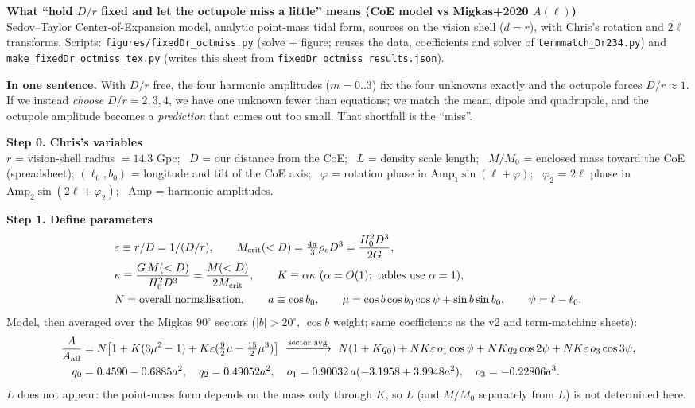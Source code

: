 \documentclass[10pt]{article}
\begin{document}
{\large\textbf{What ``hold $D/r$ fixed and let the octupole miss a little'' means (CoE model vs Migkas+2020 $A(\ell)$)}}\\[2pt]
Sedov--Taylor Center-of-Expansion model, analytic point-mass tidal form, sources on the vision shell ($d=r$), with Chris's rotation and $2\ell$ transforms.
Scripts: \texttt{figures/fixedDr\_octmiss.py} (solve + figure; reuses the data, coefficients and solver of \texttt{termmatch\_Dr234.py}) and \texttt{make\_fixedDr\_octmiss\_tex.py} (writes this sheet from \texttt{fixedDr\_octmiss\_results.json}).

\textbf{In one sentence.} With $D/r$ free, the four harmonic amplitudes ($m=0..3$) fix the four unknowns exactly and the octupole forces $D/r\approx1$. If we instead \emph{choose} $D/r=2,3,4$, we have one unknown fewer than equations; we match the mean, dipole and quadrupole, and the octupole amplitude becomes a \emph{prediction} that comes out too small. That shortfall is the ``miss''.

\medskip\textbf{Step 0. Chris's variables}\\
$r$ = vision-shell radius $=14.3$ Gpc; \ $D$ = our distance from the CoE; \ $L$ = density scale length; \ $M/M_0$ = enclosed mass toward the CoE (spreadsheet);
$(\ell_0,b_0)$ = longitude and tilt of the CoE axis; \ $\varphi$ = rotation phase in $\mathrm{Amp}_1\sin(\ell+\varphi)$; \ $\varphi_2$ = $2\ell$ phase in $\mathrm{Amp}_2\sin(2\ell+\varphi_2)$; \ Amp = harmonic amplitudes.

\medskip\textbf{Step 1. Define parameters}
\begin{align*}
&\varepsilon\equiv r/D=1/(D/r),\qquad M_{\rm crit}(<D)=\tfrac{4\pi}{3}\rho_cD^3=\frac{H_0^2D^3}{2G},\\
&\kappa\equiv\frac{G\,M(<D)}{H_0^2D^3}=\frac{M(<D)}{2M_{\rm crit}},\qquad K\equiv\alpha\kappa\ (\alpha=O(1);\ \text{tables use }\alpha=1),\\
&N=\text{overall normalisation},\qquad a\equiv\cos b_0,\qquad \mu=\cos b\cos b_0\cos\psi+\sin b\sin b_0,\qquad \psi=\ell-\ell_0 .
\end{align*}
Model, then averaged over the Migkas $90^\circ$ sectors ($|b|>20^\circ$, $\cos b$ weight; same coefficients as the v2 and term-matching sheets):
\begin{align*}
\frac{A}{A_{\rm all}}&=N\big[1+K(3\mu^2-1)+K\varepsilon(\tfrac92\mu-\tfrac{15}{2}\mu^3)\big]
\ \xrightarrow{\text{sector avg}}\ N(1+Kq_0)+NK\varepsilon\,o_1\cos\psi+NKq_2\cos2\psi+NK\varepsilon\,o_3\cos3\psi,\\
q_0&=0.4590-0.6885a^2,\quad q_2=0.49052a^2,\quad o_1=0.90032\,a(-3.1958+3.9948a^2),\quad o_3=-0.22806a^3 .
\end{align*}
$L$ does not appear: the point-mass form depends on the mass only through $K$, so $L$ (and $M/M_0$ separately from $L$) is not determined here.
\end{document}
